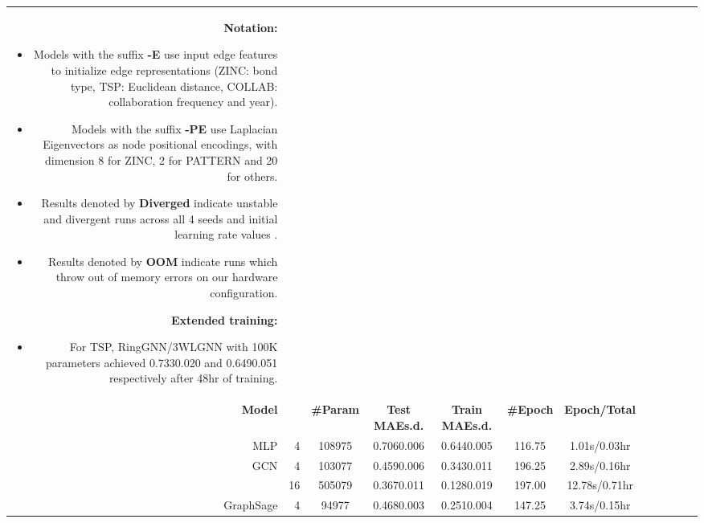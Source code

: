 \documentclass{article}
\begin{document}
\begin{table}[t!]
{\begin{tabular}{rr|ccccc|ccccc}
{{        \vspace{0.05cm}
        \textbf{Notation:}\\
        \vspace{-0.1cm}
        \begin{itemize}[leftmargin=*]
            \item Models with the suffix \textbf{-E} use input edge features to initialize edge representations (ZINC: bond type, TSP: Euclidean distance, COLLAB: collaboration frequency and year).\vspace{-0.05cm}
            \item Models with the suffix \textbf{-PE} use Laplacian Eigenvectors as node positional encodings, with dimension 8 for ZINC, 2 for PATTERN and 20 for others.\vspace{-0.05cm}
            \item Results denoted by \textbf{Diverged} indicate unstable and divergent runs across all 4 seeds and initial learning rate values .\vspace{-0.05cm}
            \item Results denoted by \textbf{OOM} indicate runs which throw out of memory errors on our hardware configuration.\vspace{-0.05cm}
        \end{itemize}
        \vspace{0.05cm}
        \textbf{Extended training:}\\
        \vspace{-0.1cm}
        \begin{itemize}[leftmargin=*]
            \item For TSP, RingGNN/3WLGNN with 100K parameters achieved 0.7330.020 and 0.6490.051 respectively after 48hr of training.
        \end{itemize}
        } } \\
        \textbf{Model} & \textbf{} & \textbf{\#Param} & \textbf{Test MAEs.d.} & \textbf{Train MAEs.d.} & \textbf{\#Epoch} & \textbf{Epoch/Total} & \\
        \cline{1-7}
        \cline{1-7}
        MLP & 4 & 108975 & 0.7060.006 & 0.6440.005 & 116.75 & 1.01s/0.03hr \\
\cline{1-7}
        GCN & 4 & 103077 & 0.4590.006 & 0.3430.011 & 196.25 & 2.89s/0.16hr & \\
         & 16 & 505079 & 0.3670.011 & 0.1280.019 & 197.00 & 12.78s/0.71hr & \\
        GraphSage & 4 & 94977 & 0.4680.003 & 0.2510.004 & 147.25 & 3.74s/0.15hr & \\

\end{tabular}}
\end{table}
\end{document}
